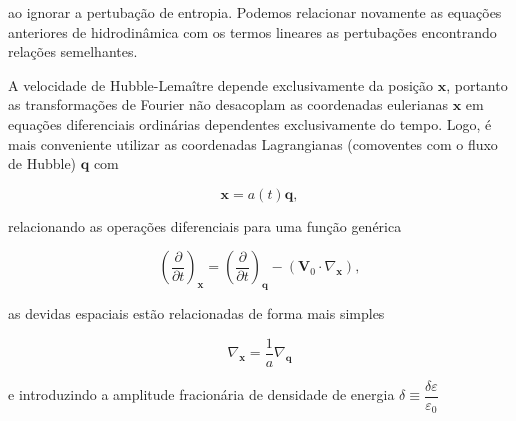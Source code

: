 ao ignorar a pertubação de entropia. Podemos relacionar novamente as equações anteriores de hidrodinâmica com os termos lineares as pertubações encontrando relações semelhantes. 

A velocidade de Hubble-Lemaître depende exclusivamente da posição $ \mathbf{x} $, portanto as transformações de Fourier não desacoplam as coordenadas eulerianas $ \mathbf{x} $ em equações diferenciais ordinárias dependentes exclusivamente do tempo. Logo, é mais conveniente utilizar as coordenadas Lagrangianas (comoventes com o fluxo de Hubble) $ \mathbf{q} $ com  

\begin{equation}\label{eq24}
	\mathbf{x} = a(t)\mathbf{q},
\end{equation}

relacionando as operações diferenciais para uma função genérica 

\begin{equation}\label{eq25}
	\left(\dfrac{\partial}{\partial t}\right)_\mathbf{x} = \left( \dfrac{\partial}{\partial t} \right)_\mathbf{q} - (\mathbf{V}_0 \cdot \nabla_\mathbf{x}),
\end{equation}

as devidas espaciais estão relacionadas de forma mais simples

\begin{equation}\label{eq26}
	\nabla_\mathbf{x} = \dfrac{1}{a}\nabla_\mathbf{q}
\end{equation}

e introduzindo a amplitude fracionária de densidade de energia $ \delta \equiv \dfrac{\delta\varepsilon}{\varepsilon_0} $





